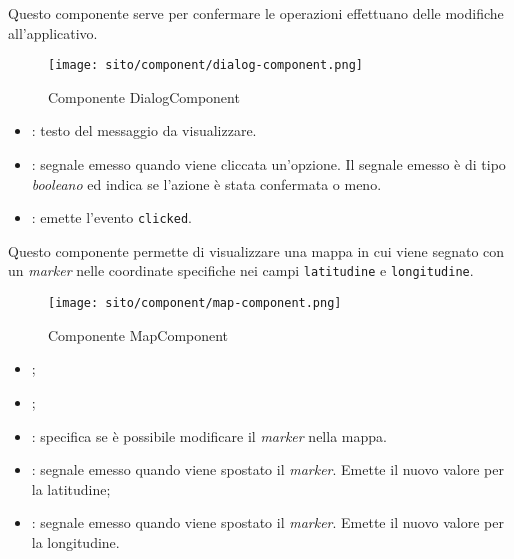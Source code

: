 \label{par:Dialog}
Questo componente serve per confermare le operazioni effettuano delle modifiche all'applicativo.

\begin{figure}[H] 
    \centering 
    \texttt{[image: sito/component/dialog-component.png]} 
    \caption{Componente DialogComponent}
\end{figure}

\begin{itemize}
    \item {}: testo del messaggio da visualizzare.
\end{itemize}

\begin{itemize}
    \item {}: segnale emesso quando viene cliccata un'opzione. Il segnale emesso è di tipo \textit{booleano} ed indica se l'azione è stata confermata o meno. 
\end{itemize}

\begin{itemize}
    \item {}: emette l'evento \texttt{clicked}. 
\end{itemize}


\label{par:MapComponent}
Questo componente permette di visualizzare una mappa in cui viene segnato con un \textit{marker} nelle coordinate specifiche nei campi \texttt{latitudine} e \texttt{longitudine}.
\begin{figure}[H] 
    \centerline{\texttt{[image: sito/component/map-component.png]}} 
    \caption{Componente MapComponent}
\end{figure}

\begin{itemize}
    \item {};
    \item {};
    \item {}: specifica se è possibile modificare il \textit{marker} nella mappa.
\end{itemize}

\begin{itemize}
    \item {}: segnale emesso quando viene spostato il \textit{marker}. Emette il nuovo valore per la latitudine; 
    \item {}: segnale emesso quando viene spostato il \textit{marker}. Emette il nuovo valore per la longitudine.
\end{itemize}

